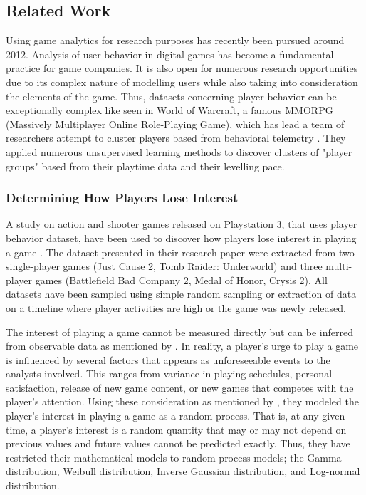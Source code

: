 \subsection{Related Work}
Using game analytics for research purposes has recently been pursued around 2012.  Analysis of user behavior in digital games has become a fundamental practice for game companies. It is also open for numerous research opportunities due to its complex nature of modelling users while also taking into consideration the elements of the game. Thus, datasets concerning player behavior can be exceptionally complex like seen in World of Warcraft, a famous MMORPG (Massively Multiplayer Online Role-Playing Game), which has lead a team of researchers attempt to cluster players based from behavioral telemetry \cite{ref:player_clustering_wow}. They applied numerous unsupervised learning methods to discover clusters of "player groups" based from their playtime data and their levelling pace.

\subsubsection{Determining How Players Lose Interest}
A study on action and shooter games released on Playstation 3, that uses player behavior dataset, have been used to discover how players lose interest in playing a game \cite{ref:how_players_lose_interest}. The dataset presented in their research paper were extracted from two single-player games (Just Cause 2, Tomb Raider: Underworld) and three multi-player games (Battlefield Bad Company 2, Medal of Honor, Crysis 2).  All datasets have been sampled using simple random sampling or extraction of data on a timeline where player activities are high or the game was newly released.

The interest of playing a game cannot be measured directly but can be inferred from observable data as mentioned by \cite{ref:how_players_lose_interest}. In reality, a player's urge to play a game is influenced by several factors that appears as unforeseeable events to the analysts involved. This ranges from variance in playing schedules, personal satisfaction, release of new game content, or new games that competes with the player's attention. Using these consideration as mentioned by \cite{ref:how_players_lose_interest}, they modeled the player's interest in playing a game as a random process. That is, at any given time, a player's interest is a random quantity that may or may not depend on previous values and future values cannot be predicted exactly. Thus, they have restricted their mathematical models to random process models; the Gamma distribution, Weibull distribution, Inverse Gaussian distribution, and Log-normal distribution.

